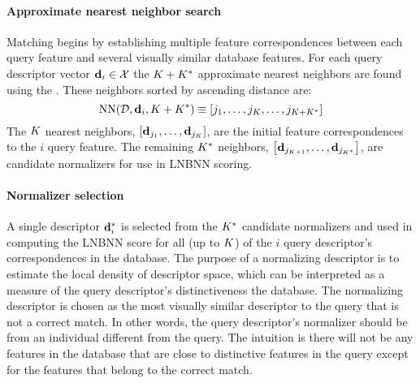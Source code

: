         \paragraph{Approximate nearest neighbor search}

            Matching begins by establishing multiple feature correspondences between each query feature and several
            visually similar database features. For each query descriptor vector $\mathbf{d}_i \in \mathcal{X}$ the $K + K^{*}$
            approximate nearest neighbors are found using the . These neighbors
            sorted by ascending distance are:
            \begin{equation}
                \operatorname{NN}(\mathcal{D}, \mathbf{d}_i, K + K^{*}) \equiv \left[j_1{}, \ldots{}, j_{K}, \ldots, j_{K + K^{*}}\right]
            \end{equation}
            The $K$ nearest neighbors, $\left[\mathbf{d}_{{j_1}}, \ldots{}, \mathbf{d}_{{j_{K}}}\right]$, are the initial feature correspondences
            to the $i$\th{} query feature. The remaining $K^{*}$ neighbors, $\left[\mathbf{d}_{{j_{K +
            1}}}, \ldots{}, \mathbf{d}_{j_{K^{*}}}\right]$, are candidate normalizers for use in LNBNN scoring.

        \paragraph{Normalizer selection}
            A single descriptor $\mathbf{d}^{*}_{i}$ is selected from the $K^{*}{}$ candidate normalizers and used in
            computing the LNBNN score for all (up to $K$) of the $i$\th{} query descriptor's correspondences in
            the database. The purpose of a normalizing descriptor is to estimate the local density of descriptor
            space, which can be interpreted as a measure of the query descriptor's distinctiveness \wrt{} the
            database. The normalizing descriptor is chosen as the most visually similar descriptor to the query
            that is not a correct match. In other words, the query descriptor's normalizer should be from an
            individual different from the query. The intuition is there will not be any features in the database
            that are close to distinctive features in the query except for the features that belong to the correct
            match.

